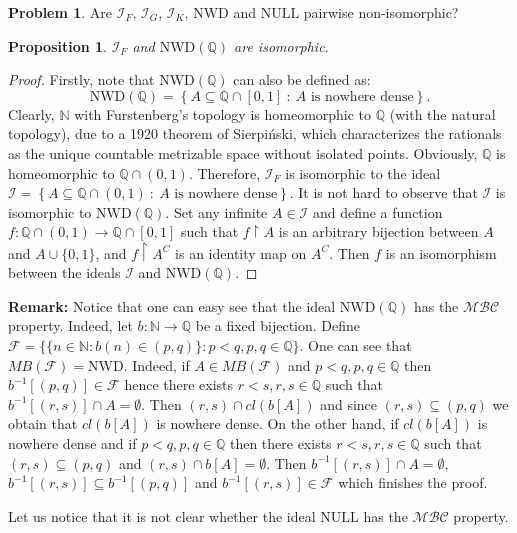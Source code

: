 \documentclass{amsart}
\newtheorem{prop}{Proposition}
\theoremstyle{definition}
\newtheorem{problem}{Problem}
\theoremstyle{definition}
\newcommand{\N}{{\mathbb N}}
\newcommand{\Q}{{\mathbb Q}}
\newcommand{\I}{\mathcal I}
\begin{document}
\begin{problem}
Are $\I_F$, $\I_G$, $\I_K$, $\textrm{NWD}$ and $\textrm{NULL}$ pairwise non-isomorphic?
\end{problem}


\begin{prop}
$\I_F$ and $\textrm{NWD}(\Q)$ are isomorphic.
\end{prop}
\begin{proof}
Firstly, note that $\textrm{NWD}(\Q)$ can also be defined as:
$$\textrm{NWD}(\Q)=\left\{A\subseteq\mathbb{Q}\cap [0,1]\ :\ A \textrm{ is nowhere dense}\right\}.$$
Clearly, $\N$ with Furstenberg's topology is homeomorphic to $\Q$ (with the natural topology), due to a 1920 theorem of Sierpi\'nski, which characterizes the rationals as the unique countable metrizable space without isolated points. Obviously, $\Q$ is homeomorphic to $\Q\cap (0,1)$. Therefore, $\I_F$ is isomorphic to the ideal $\I = \left\{A\subseteq\Q\cap (0,1)\ :\ A \textrm{ is nowhere dense}\right\}$. It is not hard to observe that $\I$ is isomorphic to $\textrm{NWD}(\Q)$. Set any infinite $A\in\I$ and define a function $f : \Q\cap (0,1) \to \Q\cap [0,1]$ such that $f\upharpoonright A$ is an arbitrary bijection between $A$ and $A\cup\{0,1\}$, and $f\upharpoonright A^C$ is an identity map on $A^C$.
Then $f$ is an isomorphism between the ideals $\I$ and $\textrm{NWD}(\Q)$.
\end{proof}

\textbf{Remark:} Notice that one can easy see that the ideal $\textrm{NWD}(\Q)$ has the 
$\mathcal{MBC}$ property. Indeed, let $b\colon \N \to \Q$
be a fixed bijection. Define
$\mathcal{F} = \lbrace \lbrace n\in\N\colon b(n) \in (p, q)\rbrace\colon p < q, p, q \in \Q\rbrace$.
One can see that $MB(\mathcal{F}) = \mathrm{NWD}$. Indeed, if $A\in MB(\mathcal{F})$
and $p < q, p, q \in \Q$ then $b^{-1}[(p, q)] \in \mathcal{F}$ hence there
exists $r < s, r, s \in \Q$ such that $b^{-1}[(r, s)] \cap A = \emptyset$.
Then $(r, s) \cap \mathit{cl}(b[A])$ and since $(r, s) \subseteq (p, q)$ we obtain that 
$\mathit{cl}(b[A])$ is nowhere dense. On the other hand, if $\mathit{cl}(b[A])$ is nowhere dense and if
$p < q, p, q \in \Q$ then there exists $r < s, r, s \in \Q$
such that $(r, s) \subseteq (p, q)$ and 
$(r, s) \cap b[A] = \emptyset$. Then $b^{-1}[(r, s)] \cap A = \emptyset$,
$b^{-1}[(r, s)] \subseteq b^{-1}[(p, q)]$ and
$b^{-1}[(r, s)] \in \mathcal{F}$ which finishes the proof.

Let us notice that it is not clear whether the ideal $\textrm{NULL}$ has the $\mathcal{MBC}$ property.
\end{document}
